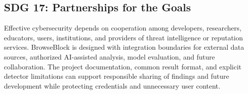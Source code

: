 \subsection{SDG 17: Partnerships for the Goals}
Effective cybersecurity depends on cooperation among developers, researchers,
educators, users, institutions, and providers of threat intelligence or
reputation services. BrowseBlock is designed with integration boundaries for
external data sources, authorized AI-assisted analysis, model evaluation, and
future collaboration. The project documentation, common result format, and
explicit detector limitations can support responsible sharing of findings and
future development while protecting credentials and unnecessary user content.
